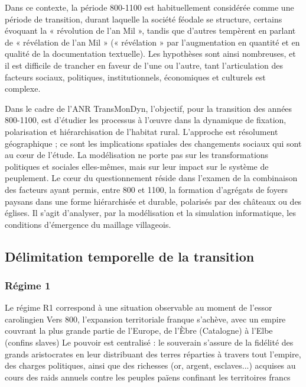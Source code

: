 Dans ce contexte, la période 800-1100 est habituellement considérée comme une période de transition, durant laquelle la société féodale se structure, certains évoquant la « révolution de l'an Mil »\autocite{fossier_enfance_1982}, tandis que d'autres tempèrent en parlant de « révélation de l'an Mil » \autocite{barthelemy_societe_1993}(« révélation » par l'augmentation en quantité et en qualité de la documentation textuelle).
Les hypothèses sont ainsi nombreuses, et il est difficile de trancher en faveur de l'une ou l'autre, tant l'articulation des facteurs sociaux, politiques, institutionnels, économiques et culturels est complexe.

Dans le cadre de l'ANR TransMonDyn, l'objectif, pour la transition des années 800-1100, est d'étudier les processus à l'œuvre dans la dynamique de fixation, polarisation et hiérarchisation de l'habitat rural.
L'approche est résolument géographique ; ce sont les implications spatiales des changements sociaux qui sont au cœur de l'étude.
La modélisation ne porte pas sur les transformations politiques et sociales elles-mêmes, mais sur leur impact sur le système de peuplement.
Le cœur du questionnement réside dans l'examen de la combinaison des facteurs ayant permis, entre 800 et 1100, la formation d'agrégats de foyers paysans dans une forme hiérarchisée et durable, polarisés par des châteaux ou des églises.
Il s'agit d'analyser, par la modélisation et la simulation informatique, les conditions d'émergence du maillage villageois.

\subsection{Délimitation temporelle de la transition}

\subsubsection{Régime 1}

Le régime R1 correspond à une situation observable au moment de l'essor carolingien
Vers 800, l'expansion territoriale franque s'achève, avec un empire couvrant la plus grande partie de l'Europe, de l'Èbre (Catalogne) à l'Elbe (confins slaves)
Le pouvoir est centralisé : le souverain s'assure de la fidélité des grands aristocrates en leur distribuant des terres réparties à travers tout l'empire, des charges politiques, ainsi que des richesses (or, argent, esclaves...) acquises au cours des raids annuels contre les peuples païens confinant les territoires francs


